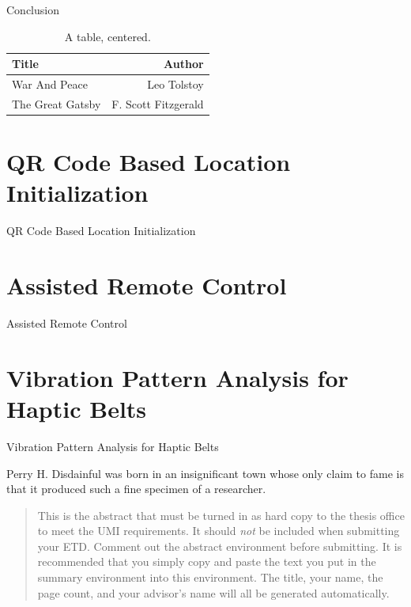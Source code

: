 \documentclass[12pt]{gatech-thesis}
\begin{document}
Conclusion


\begin{table}
\caption{A table, centered.}
\begin{center}
\begin{tabular}{|l|r|}
  \hline 
Title & Author \\
\hline
War And Peace & Leo Tolstoy \\
The Great Gatsby & F. Scott Fitzgerald \\ \hline
\end{tabular}
\end{center}
\end{table}





\appendix
\chapter{QR Code Based Location Initialization}

QR Code Based Location Initialization

\chapter{Assisted Remote Control}

Assisted Remote Control

\chapter{Vibration Pattern Analysis for Haptic Belts}

Vibration Pattern Analysis for Haptic Belts


\begin{postliminary}
{}
\begin{vita}
Perry H. Disdainful was born in an insignificant town
whose only claim to fame is that it produced such a fine
specimen of a researcher.
\end{vita}
\end{postliminary}

\begin{abstract}
  This is the abstract that must be turned in as hard copy to the
  thesis office to meet the UMI requirements. It should \emph{not} be
  included when submitting your ETD. Comment out the abstract
  environment before submitting. It is recommended that you simply
  copy and paste the text you put in the summary environment into this
  environment. The title, your name, the page count, and your
  advisor's name will all be generated automatically.
\end{abstract}
\end{document}
